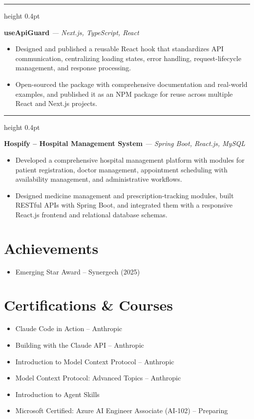 \documentclass[a4paper,10.5pt]{article}
\newcommand{\projectdivider}{\vspace{6pt}\textcolor{dividercolor}{\hrule height 0.4pt}\vspace{6pt}}
\newcommand{\projecttitle}[2]{\noindent\textbf{#1} \textit{#2}\par\vspace{2pt}}
\begin{document}
\projectdivider

\projecttitle{useApiGuard}{--- Next.js, TypeScript, React}
\begin{itemize}
\item Designed and published a reusable React hook that standardizes API communication, centralizing loading states, error handling, request-lifecycle management, and response processing.
\item Open-sourced the package with comprehensive documentation and real-world examples, and published it as an NPM package for reuse across multiple React and Next.js projects.
\end{itemize}

\projectdivider

\projecttitle{Hospify -- Hospital Management System}{--- Spring Boot, React.js, MySQL}
\begin{itemize}
\item Developed a comprehensive hospital management platform with modules for patient registration, doctor management, appointment scheduling with availability management, and administrative workflows.
\item Designed medicine management and prescription-tracking modules, built RESTful APIs with Spring Boot, and integrated them with a responsive React.js frontend and relational database schemas.
\end{itemize}

\section*{Achievements}
\begin{itemize}
\item Emerging Star Award -- Synergech (2025)
\end{itemize}

\section*{Certifications \& Courses}
\begin{itemize}
\item Claude Code in Action -- Anthropic
\item Building with the Claude API -- Anthropic
\item Introduction to Model Context Protocol -- Anthropic
\item Model Context Protocol: Advanced Topics -- Anthropic
\item Introduction to Agent Skills
\item Microsoft Certified: Azure AI Engineer Associate (AI-102) -- Preparing
\end{itemize}
\end{document}
